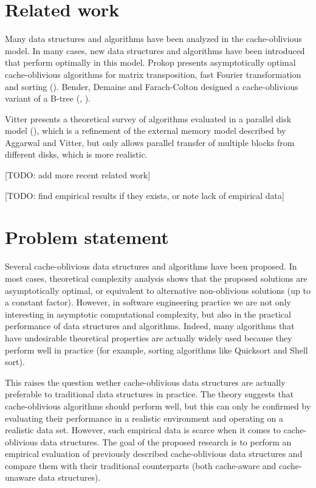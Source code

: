 \documentclass{acm_proc_article-sp}
\begin{document}
\section{Related work}
Many data structures and algorithms have been analyzed in the cache-oblivious model. In many cases, new data structures and algorithms have been introduced that perform optimally in this model. Prokop presents asymptotically optimal cache-oblivious algorithms for matrix transposition, fast Fourier transformation and sorting (\cite{prokop1999coa}). Bender, Demaine and Farach-Colton designed a cache-oblivious variant of a B-tree (\cite{bender2005cob}, \cite{bender2004lpc}).

Vitter presents a theoretical survey of algorithms evaluated in a parallel disk model (\cite{vitter2001ema}), which is a refinement of the external memory model described by Aggarwal and Vitter, but only allows parallel transfer of multiple blocks from different disks, which is more realistic.

[TODO: add more recent related work]

[TODO: find empirical results if they exists, or note lack of empirical data]

\section{Problem statement}
Several cache-oblivious data structures and algorithms have been proposed. In most cases, theoretical complexity analysis shows that the proposed solutions are asymptotically optimal, or equivalent to alternative non-oblivious solutions (up to a constant factor). However, in software engineering practice we are not only interesting in asymptotic computational complexity, but also in the practical performance of data structures and algorithms. Indeed, many algorithms that have undesirable theoretical properties are actually widely used because they perform well in practice (for example, sorting algorithms like Quicksort and Shell sort).

This raises the question wether cache-oblivious data structures are actually preferable to traditional data structures in practice. The theory suggests that cache-oblivious algorithms should perform well, but this can only be confirmed by evaluating their performance in a realistic environment and operating on a realistic data set. However, such empirical data is scarce when it comes to cache-oblivious data structures. The goal of the proposed research is to perform an empirical evaluation of previously described cache-oblivious data structures and compare them with their traditional counterparts (both cache-aware and cache-unaware data structures).
\end{document}
